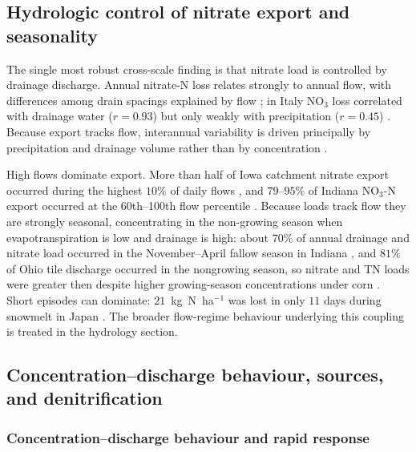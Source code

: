 \documentclass[11pt]{article}
\begin{document}
\subsection{Hydrologic control of nitrate export and seasonality}

The single most robust cross-scale finding is that nitrate load is controlled
by drainage discharge. Annual nitrate-N loss relates strongly to annual flow,
with differences among drain spacings explained by flow
\parencite{Kladivko2021,Bauwe2020}; in Italy NO$_3$ loss correlated with
drainage water ($r=0.93$) but only weakly with precipitation ($r=0.45$)
\parencite{ROSSI1991}. Because export tracks flow, interannual variability is
driven principally by precipitation and drainage volume rather than by
concentration \parencite{Danalatos2022,BAKER1975}.

High flows dominate export. More than half of Iowa catchment nitrate export
occurred during the highest $10\%$ of daily flows \parencite{Ikenberry2014},
and $79$--$95\%$ of Indiana NO$_3$-N export occurred at the 60th--100th flow
percentile \parencite{Speir2021}. Because loads track flow they are strongly
seasonal, concentrating in the non-growing season when evapotranspiration is
low and drainage is high: about $70\%$ of annual drainage and nitrate load
occurred in the November--April fallow season in Indiana
\parencite{Kladivko2021,Kladivko2004}, and $81\%$ of Ohio tile discharge
occurred in the nongrowing season, so nitrate and TN loads were greater then
despite higher growing-season concentrations under corn \parencite{King2016}.
Short episodes can dominate: $21$~kg~N~ha$^{-1}$ was lost in only $11$ days
during snowmelt in Japan \parencite{Hayashi1999}. The broader flow-regime
behaviour underlying this coupling is treated in the hydrology section.

\subsection{Concentration--discharge behaviour, sources, and denitrification}

\subsubsection{Concentration--discharge behaviour and rapid response}
\end{document}
